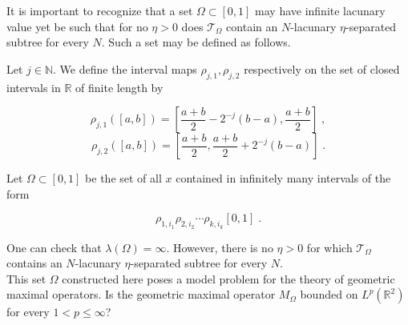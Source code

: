 \documentclass[12pt]{amsart}
\numberwithin{equation}{section}
\theoremstyle{definition}
\theoremstyle{remark}
\begin{document}
It is important to recognize that a set $\Omega \subset [0,1]$ may have infinite lacunary value yet be such that for no $\eta > 0$ does $\mathscr{T}_\Omega$ contain an $N$-lacunary $\eta$-separated subtree for every $N$.    Such a set may be defined as follows.

Let $j \in \mathbb{N}$.   We define the interval maps $\rho_{j,1} , \rho_{j,2}$ respectively on the set of closed intervals in $\mathbb{R}$ of finite length by

$$\rho_{j,1}([a,b]) = \left[\frac{a + b}{2} - 2^{-j}(b-a), \frac{a + b}{2}\right]\;,$$
$$\rho_{j,2}([a,b]) = \left[\frac{a + b}{2} , \frac{a + b}{2} + 2^{-j}(b-a)\right]\;.$$

Let $\Omega \subset [0,1]$ be the set of all $x$ contained  in infinitely many intervals of the form

$$\rho_{1,i_1}\rho_{2,i_2}\cdots \rho_{k,i_k}[0,1]\;.$$

One can check that $\lambda(\Omega) = \infty$.   However, there is no $\eta > 0$ for which  $\mathscr{T}_\Omega$ contains an $N$-lacunary $\eta$-separated subtree for every $N$. 
\\

This set $\Omega$ constructed here poses a model problem for the theory of geometric maximal operators.  Is the geometric maximal operator $M_\Omega$ bounded on $L^p(\mathbb{R}^2)$ for every $1 < p  \leq \infty$\;?
\end{document}

